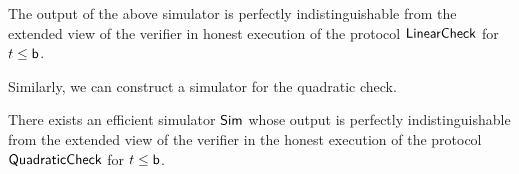 \begin{comment}
The simulator outputs $r$, $\{j_u,k_u\}_{u\in [t]}$,
$\beta$, $\tau,\delta$, $\rho$, $\tilde{\tau},\tilde{\delta}$ by uniformly and
independently sampling them from their respective domains, as in the honest
execution of the protocol. Simulator also outputs $z,\tilde{z}$ uniformly from
$L_2$, and $z'$ uniformly from $\dashL_2$ satisfying $\sum_{j\in [m]}z'[j]=0$ . It outputs
$\ewit[\cdot,\cdot,k_u]$ uniformly such that each plane has columns as codewords
in $L_2$. 
Next, the simulator outputs $\omega,\nu,\tilde{\nu}$
and $\chi_1,\ldots,\chi_t$, $\{O[\cdot,k_u]\}_{u\in [t]}$ choosing them randomly and
independently from $\FF$. Finally, the simulator outputs
$c_0,d_0,\ldots,c_{s+\ell}$ and $\tilde{d}_0,\tilde{c}_1,\ldots,\tilde{c}_\ell$ choosing 
them uniformly from $\GG$ subject to the following constraints:
$d_0 + \sum_{a=1}^{s+\ell}\mu_ac_a = \comm(z,\nu)$,
$c_0 + \sum_{a=1}^{s+\ell}\varphi_ac_a = \comm(z',\omega)$,
$\sum_{a=1}^{s+\ell}T[a,k_u]c_a = \comm(P[\cdot,k_u],\chi_u)$ for $u\in [t]$,
$\sum_{a=1}^{\ell}\mc{T}[a,k_u]\tilde{c}_a = \comm\big(\sum_{i\in
[p]}\tilde{U}[\cdot,k_u],\tilde{O}[\cdot, k_u]\big)$ for $u\in [t]$,
$\beta\tilde{d}_0 + \sum_{a=1}^{\ell}\tilde{\mu}_a\tilde{c}_a =
\comm(\tilde{z},\tilde{\nu})$. 
\end{comment}
\begin{lemma}\label{lem:simlincheck}
The output of the above simulator is perfectly indistinguishable
from the extended view of the verifier in honest execution of the protocol
$\mathsf{LinearCheck}$ for $t\leq \mathsf{b}$.
\end{lemma}

Similarly, we can construct a simulator for the quadratic check.
\begin{lemma}\label{lem:simquadcheck}
There exists an efficient simulator $\mathsf{Sim}$ whose output is perfectly
indistinguishable from the extended view of the verifier in the honest execution
of the protocol $\mathsf{QuadraticCheck}$ for $t\leq \mathsf{b}$.
\end{lemma}


